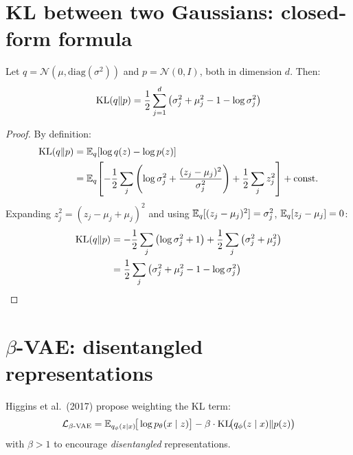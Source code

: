 \section{KL between two Gaussians: closed-form formula}
\label{sec:kl-gaussians}

\begin{theorem}
Let $q = \mathcal{N}(\mu, \text{diag}(\sigma^2))$ and $p = \mathcal{N}(0, I)$, both in dimension $d$. Then:
\begin{equation}
\mathrm{KL}(q \| p) = \frac{1}{2}\sum_{j=1}^{d} \left(\sigma_j^2 + \mu_j^2 - 1 - \log \sigma_j^2\right)
\label{eq:kl-closed-form}
\end{equation}
\end{theorem}

\begin{proof}
By definition:
\begin{align}
\mathrm{KL}(q \| p) &= \mathbb{E}_q\!\left[\log q(z) - \log p(z)\right] \\
&= \mathbb{E}_q\!\left[-\frac{1}{2}\sum_j \left(\log \sigma_j^2 + \frac{(z_j - \mu_j)^2}{\sigma_j^2}\right) + \frac{1}{2}\sum_j z_j^2\right] + \text{const.}
\end{align}
Expanding $z_j^2 = (z_j - \mu_j + \mu_j)^2$ and using $\mathbb{E}_q[(z_j - \mu_j)^2] = \sigma_j^2$, $\mathbb{E}_q[z_j - \mu_j] = 0$:
\begin{align}
\mathrm{KL}(q \| p) &= -\frac{1}{2}\sum_j \left(\log \sigma_j^2 + 1\right) + \frac{1}{2}\sum_j \left(\sigma_j^2 + \mu_j^2\right) \\
&= \frac{1}{2}\sum_j \left(\sigma_j^2 + \mu_j^2 - 1 - \log \sigma_j^2\right)
\end{align}
\end{proof}

\section{$\beta$-VAE: disentangled representations}
\label{sec:beta-vae}

\begin{definition}
Higgins et al.\ (2017) propose weighting the KL term:
\begin{equation}
\mathcal{L}_{\beta\text{-VAE}} = \mathbb{E}_{q_\phi(z|x)}\!\big[\log p_\theta(x \mid z)\big] - \beta \cdot \mathrm{KL}\!\big(q_\phi(z \mid x) \| p(z)\big)
\label{eq:beta-vae}
\end{equation}
with $\beta > 1$ to encourage \emph{disentangled} representations.
\end{definition}

